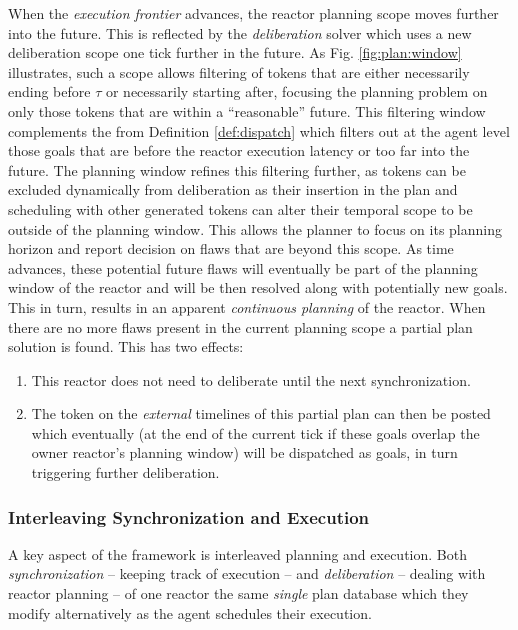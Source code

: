 When the {\em execution frontier} advances, the reactor planning scope
moves further into the future. This is reflected by the {\em
  deliberation} solver which uses a new deliberation scope one tick
further in the future. As Fig. \ref{fig:plan:window} illustrates, such
a scope allows filtering of tokens that are either necessarily ending
before $\tau$ or necessarily starting after, focusing the planning
problem on only those tokens that are within a ``reasonable'' future.
This filtering window complements the  from
Definition \ref{def:dispatch} which filters out at the agent level
those goals that are before the reactor execution latency or too far
into the future.  The planning window refines this filtering further,
as tokens can be excluded dynamically from deliberation as their
insertion in the plan and scheduling with other generated tokens can
alter their temporal scope to be outside of the planning window.  This
allows the planner to focus on its planning horizon and report
decision on flaws that are beyond this scope. As time advances, these
potential future flaws will eventually be part of the planning window
of the reactor and will be then resolved along with potentially new
goals.  This in turn, results in an apparent \emph{continuous
  planning} of the reactor. When there are no more flaws present in
the current planning scope a partial plan solution is found. This has
two effects:

\begin{enumerate}

\item This reactor does not need to deliberate until the next
  synchronization. 

\item The token on the {\em external} timelines of this partial plan
  can then be posted which eventually (at the end of the current tick
  if these goals overlap the owner reactor's planning window) will be
  dispatched as goals, in turn triggering further deliberation.

\end{enumerate}


\subsubsection{Interleaving Synchronization and Execution}
\label{sec:arch:intertwine}

A key aspect of the \rx framework is interleaved planning and
execution. Both {\em synchronization} -- keeping track of execution --
and {\em deliberation} -- dealing with reactor planning -- of one
reactor  the same {\em single} plan database which
they modify alternatively as the \rx agent schedules their execution.

